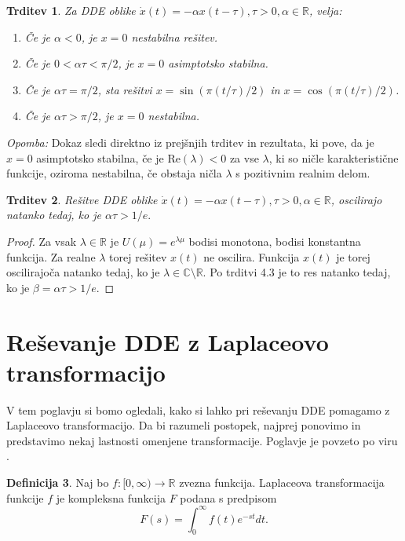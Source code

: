\documentclass[12pt,a4paper]{amsart}
\theoremstyle{definition} %
\newtheorem{definicija}{Definicija}[section]
\theoremstyle{plain} %
\newtheorem{trditev}[definicija]{Trditev}
\newcommand{\R}{\mathbb R}
\begin{document}
\begin{trditev}
    Za DDE oblike $\dot{x}(t)= -\alpha x(t-\tau), \tau >0, \alpha \in \R$, velja:
    \begin{enumerate}
        \item Če je $\alpha < 0$, je $x=0$ nestabilna rešitev.
        \item Če je $0<\alpha \tau <\pi/2$, je $x=0$ asimptotsko stabilna.
        \item Če je $\alpha \tau = \pi/2$, sta rešitvi $x=\sin(\pi(t/\tau)/2)$ in $x=\cos(\pi(t/\tau)/2)$.
        \item Če je $\alpha\tau > \pi/2$, je $x=0$ nestabilna.
    \end{enumerate}
\end{trditev}

\noindent \textit{Opomba: }Dokaz sledi direktno iz prejšnjih trditev in rezultata, ki pove, da je $x=0$ asimptotsko stabilna, če 
je $\text{Re}(\lambda) < 0$ za vse $\lambda$, ki so ničle karakteristične funkcije, oziroma nestabilna,
če obstaja ničla $\lambda$ s pozitivnim realnim delom.

\begin{trditev}
    Rešitve DDE oblike $\dot{x}(t)= -\alpha x(t-\tau), \tau >0, \alpha \in \R$,
    oscilirajo natanko tedaj, ko je $\alpha\tau>1/e.$
\end{trditev}

\begin{proof}
    Za vsak $\lambda \in \R$ je $U(\mu)=e^{\lambda\mu}$ bodisi monotona, bodisi konstantna funkcija.
    Za realne $\lambda$ torej rešitev $x(t)$ ne oscilira. Funkcija $x(t)$ je torej oscilirajoča natanko tedaj, ko
    je $\lambda\in\mathbb{C}\setminus\mathbb{R}$. Po trditvi 4.3 je to res natanko tedaj, ko je 
    $\beta = \alpha\tau > 1/e$.
\end{proof}

\section{Reševanje DDE z Laplaceovo transformacijo}



V tem poglavju si bomo ogledali, kako si lahko pri reševanju DDE pomagamo z Laplaceovo transformacijo.
Da bi razumeli postopek, najprej ponovimo in predstavimo nekaj lastnosti omenjene transformacije. Poglavje je 
povzeto po viru \cite{knjiga}.

\begin{definicija}
    Naj bo $f:[0,\infty) \to \R$ zvezna funkcija. Laplaceova transformacija funkcije $f$ je kompleksna funkcija
    $F$ podana s predpisom
    \[ F(s)=\int_{0}^{\infty}f(t)e^{-st}dt.\]
\end{definicija}
\end{document}
